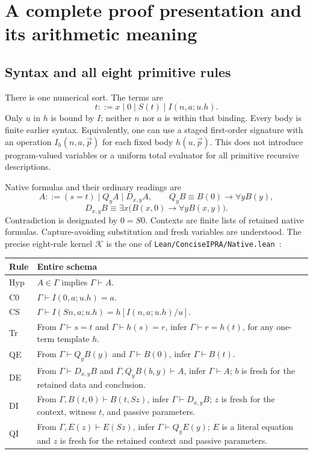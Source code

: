 \documentclass[11pt,letterpaper]{article}
\theoremstyle{definition}
\newcommand{\K}{\mathcal K}
\newcommand{\file}[1]{{\small\nolinkurl{#1}}}
\begin{document}
\section{A complete proof presentation and its arithmetic meaning}
\label{sec:presentation}

\subsection{Syntax and all eight primitive rules}

There is one numerical sort. The terms are
\[
t::=x\mid0\mid S(t)\mid I(n,a;u.h).
\]
Only $u$ in $h$ is bound by $I$; neither $n$ nor $a$ is within that binding.
Every body is finite earlier syntax. Equivalently, one can use a staged
first-order signature with an operation $I_h(n,a,\vec p)$ for each fixed
body $h(u,\vec p)$. This does not introduce program-valued variables or a
uniform total evaluator for all primitive recursive descriptions.

Native formulas and their ordinary readings are
\[
A::=(s=t)\mid Q_y A\mid D_{x,y}A,
\qquad
Q_yB\equiv B(0)\to\forall yB(y),
\]
\[
D_{x,y}B\equiv\exists x\bigl(B(x,0)\to\forall yB(x,y)\bigr).
\]
Contradiction is designated by $0=S0$. Contexts are finite lists of retained
native formulas. Capture-avoiding substitution and fresh variables are
understood. The precise eight-rule kernel $\K$ is the one of
\file{Lean/ConciseIPRA/Native.lean}~\cite{native}:

\begin{longtable}{p{}p{}}
\toprule
Rule & Entire schema\\
\midrule
\endhead
Hyp & $A\in\Gamma$ implies $\Gamma\vdash A$.\\[5pt]
C0 & $\Gamma\vdash I(0,a;u.h)=a$.\\[5pt]
CS & $\Gamma\vdash I(Sn,a;u.h)=h[I(n,a;u.h)/u]$.\\[5pt]
Tr & From $\Gamma\vdash s=t$ and $\Gamma\vdash h(s)=r$, infer $\Gamma\vdash r=h(t)$, for any one-term template $h$.\\[5pt]
QE & From $\Gamma\vdash Q_yB(y)$ and $\Gamma\vdash B(0)$, infer $\Gamma\vdash B(t)$.\\[5pt]
DE & From $\Gamma\vdash D_{x,y}B$ and $\Gamma,Q_yB(b,y)\vdash A$, infer $\Gamma\vdash A$; $b$ is fresh for the retained data and conclusion.\\[5pt]
DI & From $\Gamma,B(t,0)\vdash B(t,Sz)$, infer $\Gamma\vdash D_{x,y}B$; $z$ is fresh for the context, witness $t$, and passive parameters.\\[5pt]
QI & From $\Gamma,E(z)\vdash E(Sz)$, infer $\Gamma\vdash Q_yE(y)$; $E$ is a literal equation and $z$ is fresh for the retained context and passive parameters.\\
\bottomrule
\end{longtable}
\end{document}
